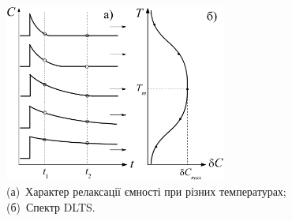 \documentclass[10pt,a5paper,titlepage,oneside]{book}
\numberwithin{equation}{part}
\begin{document}
\begin{figure}[ht]
\center
\vspace{-5mm}
\includegraphics[width=0.65\textwidth]{Fig2_3}
\vspace{-3mm}
\caption{(а)~Характер релаксації ємності при різних температурах;
(б)~Спектр DLTS.
}
\vspace{-3mm}
\label{F23}
\end{figure}
\end{document}
